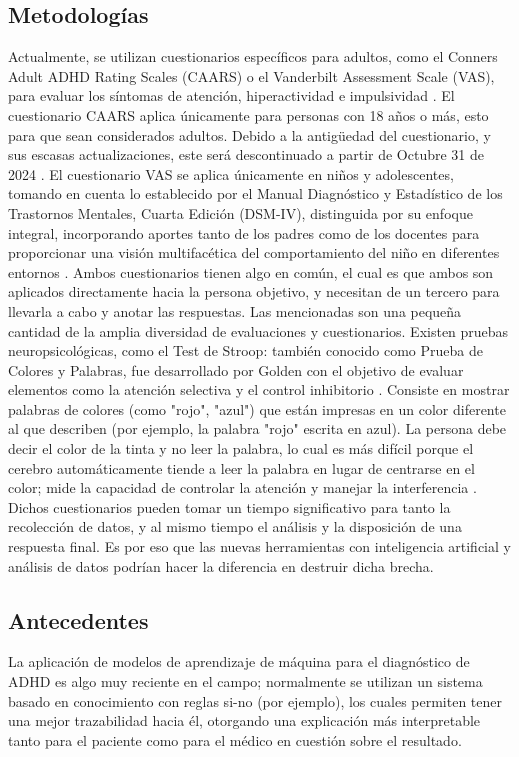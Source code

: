 \documentclass[10pt,journal,compsoc]{IEEEtran}
\begin{document}
\subsection{Metodologías}
Actualmente, se utilizan cuestionarios específicos para adultos, como el Conners Adult ADHD Rating Scales (CAARS) o el Vanderbilt Assessment Scale (VAS), para evaluar los síntomas de atención, hiperactividad e impulsividad \cite{review2003neuropsychology}. El cuestionario CAARS aplica únicamente para personas con 18 años o más, esto para que sean considerados adultos. Debido a la antigüedad del cuestionario, y sus escasas actualizaciones, este será descontinuado a partir de Octubre 31 de 2024 \cite{scales2024adult}. El cuestionario VAS se aplica únicamente en niños y adolescentes, tomando en cuenta lo establecido por el Manual Diagnóstico y Estadístico de los Trastornos Mentales, Cuarta Edición (DSM-IV), distinguida por su enfoque integral, incorporando aportes tanto de los padres como de los docentes para proporcionar una visión multifacética del comportamiento del niño en diferentes entornos \cite{vanderbilt2024tools}. Ambos cuestionarios tienen algo en común, el cual es que ambos son aplicados directamente hacia la persona objetivo, y necesitan de un tercero para llevarla a cabo y anotar las respuestas. Las mencionadas son una pequeña cantidad de la amplia diversidad de evaluaciones y cuestionarios. Existen pruebas neuropsicológicas, como el Test de Stroop: también conocido como Prueba de Colores y Palabras, fue desarrollado por Golden con el objetivo de evaluar elementos como la atención selectiva y el control inhibitorio \cite{mente2024conners}.
Consiste en mostrar palabras de colores (como "rojo", "azul") que están impresas en un color diferente al que describen (por ejemplo, la palabra "rojo" escrita en azul). La persona debe decir el color de la tinta y no leer la palabra, lo cual es más difícil porque el cerebro automáticamente tiende a leer la palabra en lugar de centrarse en el color; mide la capacidad de controlar la atención y manejar la interferencia \cite{test2024stroop}.
Dichos cuestionarios pueden tomar un tiempo significativo para tanto la recolección de datos, y al mismo tiempo el análisis y la disposición de una respuesta final. Es por eso que las nuevas herramientas con inteligencia artificial y análisis de datos podrían hacer la diferencia en destruir dicha brecha.

\subsection{Antecedentes}
La aplicación de modelos de aprendizaje de máquina para el diagnóstico de ADHD es algo muy reciente en el campo; normalmente se utilizan un sistema basado en conocimiento con reglas si-no (por ejemplo), los cuales permiten tener una mejor trazabilidad hacia él, otorgando una explicación más interpretable tanto para el paciente como para el médico en cuestión sobre el resultado.
\end{document}
